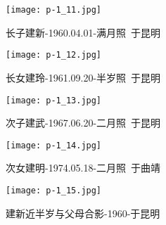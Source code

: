 \clearpage


\begin{figure}
    \begin{center}
        \texttt{[image: p-1\_11.jpg]}
        \begin{shaded}
            \caption{长子建新-1960.04.01-满月照~于昆明}
        \end{shaded}
    \end{center}
\end{figure}

\clearpage


\begin{figure}
    \begin{center}
        \texttt{[image: p-1\_12.jpg]}
        \begin{shaded}
            \caption{长女建玲-1961.09.20-半岁照~于昆明}
        \end{shaded}
    \end{center}
\end{figure}

\clearpage


\begin{figure}
    \begin{center}
        \texttt{[image: p-1\_13.jpg]}
        \begin{shaded}
            \caption{次子建武-1967.06.20-二月照~于昆明}
        \end{shaded}
    \end{center}
\end{figure}

\clearpage


\begin{figure}
    \begin{center}
        \texttt{[image: p-1\_14.jpg]}
        \begin{shaded}
            \caption{次女建明-1974.05.18-二月照~于曲靖}
        \end{shaded}
    \end{center}
\end{figure}

\clearpage


\begin{figure}
    \begin{center}
        \texttt{[image: p-1\_15.jpg]}
        \begin{shaded}
            \caption{建新近半岁与父母合影-1960-于昆明}
        \end{shaded}
    \end{center}
\end{figure}

